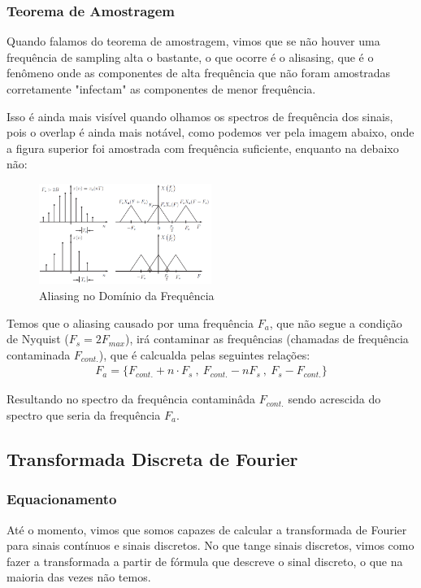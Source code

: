 \documentclass{article}
\begin{document}
\subsubsection{Teorema de Amostragem}
Quando falamos do teorema de amostragem, vimos que se não houver uma frequência de sampling alta o bastante, o que ocorre é o alisasing, que é o fenômeno onde as componentes de alta frequência que não foram amostradas corretamente "infectam" as componentes de menor frequência. 

Isso é ainda mais visível quando olhamos os spectros de frequência dos sinais, pois o overlap é ainda mais notável, como podemos ver pela imagem abaixo, onde a figura superior foi amostrada com frequência suficiente, enquanto na debaixo não:
\begin{figure}[h]
    \centering
    \includegraphics[width=0.5\textwidth]{imgs/aliasing_freq.png}
    \caption{Aliasing no Domínio da Frequência}
\end{figure}

Temos que o aliasing causado por uma frequência $F_a$, que não segue a condição de Nyquist ($F_s = 2F_{max}$), irá contaminar as frequências (chamadas de frequência contaminada $F_{cont.}$), que é calcualda pelas seguintes relações:
\begin{align}
    F_a = \{F_{cont.} + n \cdot F_s \ , \ F_{cont.} - nF_s \ , \ F_s - F_{cont.} \}
\end{align}

Resultando no spectro da frequência contaminâda $F_{cont.}$ sendo acrescida do spectro que seria da frequência $F_a$.

\subsection{Transformada Discreta de Fourier}
\subsubsection{Equacionamento}
Até o momento, vimos que somos capazes de calcular a transformada de Fourier para sinais contínuos e sinais discretos. No que tange sinais discretos, vimos como fazer a transformada a partir de fórmula que descreve o sinal discreto, o que na maioria das vezes não temos. 
\end{document}
